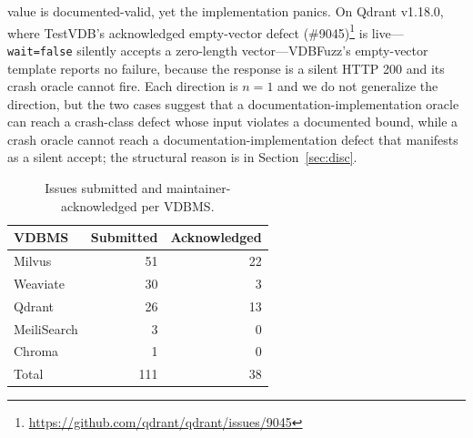 \documentclass[sigconf]{acmart}
\begin{document}
value is documented-valid, yet the implementation panics. On Qdrant v1.18.0, where TestVDB's acknowledged empty-vector defect (\#9045)\footnote{\url{https://github.com/qdrant/qdrant/issues/9045}} is live---\texttt{wait=false} silently accepts a zero-length vector---VDBFuzz's empty-vector template reports no failure, because the response is a silent HTTP 200 and its crash oracle cannot fire. Each direction is $n{=}1$ and we do not generalize the direction, but the two cases suggest that a documentation-implementation oracle can reach a crash-class defect whose input violates a documented bound, while a crash oracle cannot reach a documentation-implementation defect that manifests as a silent accept; the structural reason is in Section~\ref{sec:disc}.

\begin{table}[t]
\caption{Issues submitted and maintainer-acknowledged per VDBMS.}
\label{tab:yield}
\small
\begin{tabular}{@{}lrr@{}}
\toprule
VDBMS & Submitted & Acknowledged \\
\midrule
Milvus & 51 & 22 \\
Weaviate & 30 & 3 \\
Qdrant & 26 & 13 \\
MeiliSearch & 3 & 0 \\
Chroma & 1 & 0 \\
\midrule
Total & 111 & 38 \\
\bottomrule
\end{tabular}
\end{table}
\end{document}
